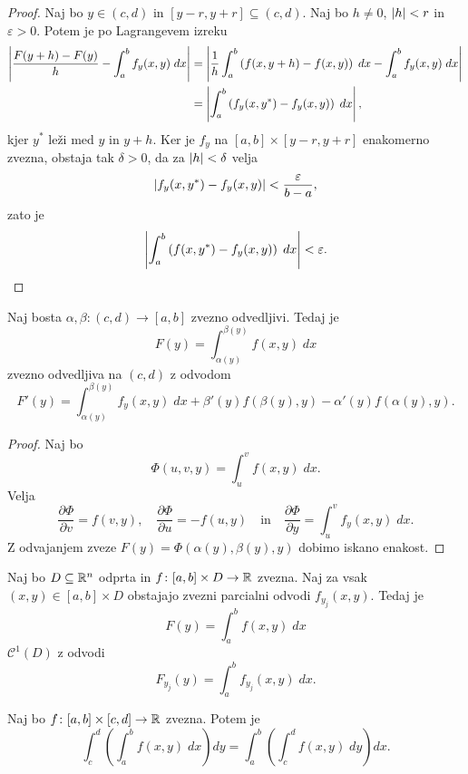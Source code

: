 \begin{proof}
Naj bo $y \in (c,d)$ in $[y-r,y+r] \subseteq (c,d)$. Naj bo
$h \ne 0$, $\left\lvert h\right\rvert < r$ in $\varepsilon > 0$. Potem je po
Lagrangevem izreku
\begin{align*}
\left\lvert \frac{F(y+h) - F(y)}{h} - \int_a^b f_y(x,y)\;dx\right\rvert &=
\left\lvert \frac{1}{h} \int_a^b \left(f(x,y+h) - f(x,y)\right)\;dx -
\int_a^b f_y(x,y)\;dx\right\rvert
\\
&= \left\lvert \int_a^b \left(f_y(x,y^*) - f_y(x,y)\right)\;dx\right\rvert,
\end{align*}
kjer $y^*$ leži med $y$ in $y+h$. Ker je $f_y$ na
$[a,b] \times [y-r,y+r]$ enakomerno zvezna, obstaja tak
$\delta > 0$, da za $\left\lvert h\right\rvert < \delta$ velja
\[
\left\lvert f_y(x,y^*) - f_y(x,y)\right\rvert < \frac{\varepsilon}{b-a},
\]
zato je
\[
\left\lvert \int_a^b \left(f(x,y^*) - f_y(x,y)\right)\;dx\right\rvert < \varepsilon.
\qedhere
\]
\end{proof}

\begin{posledica}
Naj bosta $\alpha,\beta \colon (c,d) \to [a,b]$ zvezno odvedljivi.
Tedaj je
\[
F(y) = \int_{\alpha(y)}^{\beta(y)} f(x,y)\;dx
\]
zvezno odvedljiva na $(c,d)$ z odvodom
\[
F'(y) = \int_{\alpha(y)}^{\beta(y)} f_y(x,y)\;dx +
\beta'(y) f(\beta(y),y) - \alpha'(y) f(\alpha(y),y).
\]
\end{posledica}

\begin{proof}
Naj bo
\[
\Phi(u,v,y) = \int_u^v f(x,y)\;dx.
\]
Velja
\[
\frac{\partial \Phi}{\partial v} = f(v,y),
\quad
\frac{\partial \Phi}{\partial u} = -f(u,y)
\quad \text{in} \quad
\frac{\partial \Phi}{\partial y} = \int_u^v f_y(x,y)\;dx.
\]
Z odvajanjem zveze $F(y) = \Phi(\alpha(y),\beta(y),y)$ dobimo
iskano enakost.
\end{proof}

\begin{posledica}
Naj bo $D \subseteq \mathbb{R}^n$ odprta in
$f \colon [a,b] \times D \to \mathbb{R}$ zvezna. Naj za vsak
$(x,y) \in [a,b] \times D$ obstajajo zvezni parcialni odvodi
$f_{y_j}(x,y)$. Tedaj je
\[
F(y) = \int_a^b f(x,y)\;dx
\]
$\mathcal{C}^1(D)$ z odvodi
\[
F_{y_j}(y) =  \int_a^b f_{y_j}(x,y)\;dx.
\]
\end{posledica}


\begin{izrek}[Fubini]\label{iz:fub1}
Naj bo $f \colon [a,b] \times [c,d] \to \mathbb{R}$ zvezna. Potem je
\[
\int_c^d \left(\int_a^b f(x,y)\;dx\right) dy =
\int_a^b \left(\int_c^d f(x,y)\;dy\right) dx.
\]
\end{izrek}

